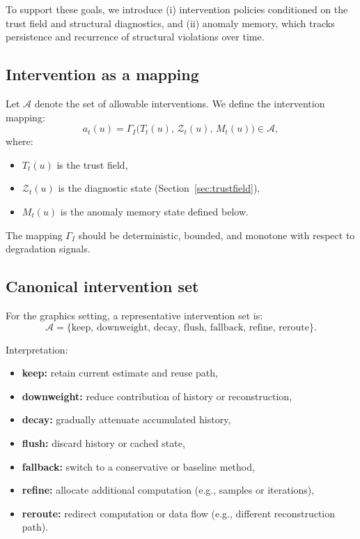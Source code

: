 \documentclass[11pt,letterpaper]{article}
\theoremstyle{gcresult}
\theoremstyle{definition}
\begin{document}
To support these goals, we introduce (i) intervention policies conditioned on the trust field and structural diagnostics, and (ii) anomaly memory, which tracks persistence and recurrence of structural violations over time.


\subsection{Intervention as a mapping}

Let $\mathcal{A}$ denote the set of allowable interventions. We define the intervention mapping:
\begin{equation}
a_t(u)=\Gamma_I\!\bigl(T_t(u),\,\mathcal{Z}_t(u),\,M_t(u)\bigr)\in\mathcal{A},
\end{equation}
where:
\begin{itemize}[leftmargin=1.5em]
    \item $T_t(u)$ is the trust field,
    \item $\mathcal{Z}_t(u)$ is the diagnostic state (Section~\ref{sec:trustfield}),
    \item $M_t(u)$ is the anomaly memory state defined below.
\end{itemize}

The mapping $\Gamma_I$ should be deterministic, bounded, and monotone with respect to degradation signals.


\subsection{Canonical intervention set}

For the graphics setting, a representative intervention set is:
\begin{equation}
\mathcal{A}=
\{
\mathrm{keep},\,
\mathrm{downweight},\,
\mathrm{decay},\,
\mathrm{flush},\,
\mathrm{fallback},\,
\mathrm{refine},\,
\mathrm{reroute}
\}.
\end{equation}

Interpretation:
\begin{itemize}[leftmargin=1.5em]
    \item \textbf{keep:} retain current estimate and reuse path,
    \item \textbf{downweight:} reduce contribution of history or reconstruction,
    \item \textbf{decay:} gradually attenuate accumulated history,
    \item \textbf{flush:} discard history or cached state,
    \item \textbf{fallback:} switch to a conservative or baseline method,
    \item \textbf{refine:} allocate additional computation (e.g., samples or iterations),
    \item \textbf{reroute:} redirect computation or data flow (e.g., different reconstruction path).
\end{itemize}
\end{document}
